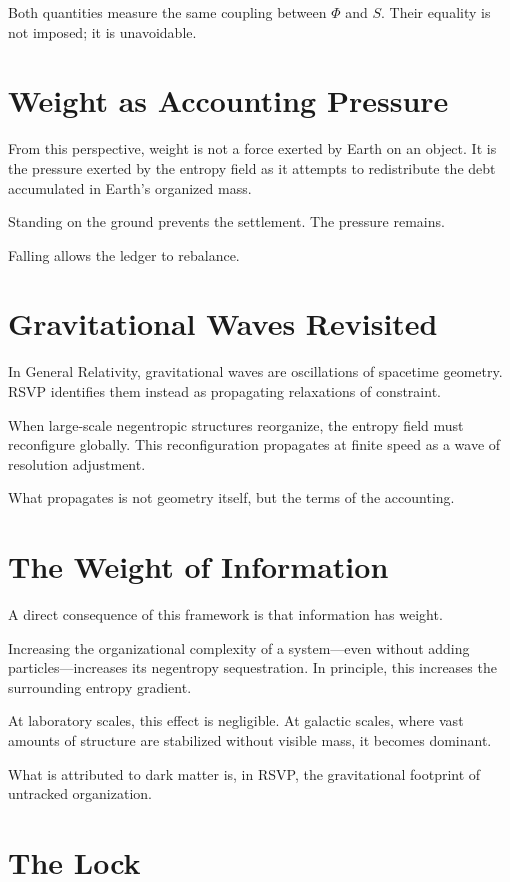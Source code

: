 \documentclass[11pt]{book}
\begin{document}
Both quantities measure the same coupling between \(\Phi\) and \(S\). Their equality is not imposed; it is unavoidable.

\section{Weight as Accounting Pressure}

From this perspective, weight is not a force exerted by Earth on an object. It is the pressure exerted by the entropy field as it attempts to redistribute the debt accumulated in Earth's organized mass.

Standing on the ground prevents the settlement. The pressure remains.

Falling allows the ledger to rebalance.

\section{Gravitational Waves Revisited}

In General Relativity, gravitational waves are oscillations of spacetime geometry. RSVP identifies them instead as propagating relaxations of constraint.

When large-scale negentropic structures reorganize, the entropy field must reconfigure globally. This reconfiguration propagates at finite speed as a wave of resolution adjustment.

What propagates is not geometry itself, but the terms of the accounting.

\section{The Weight of Information}

A direct consequence of this framework is that information has weight.

Increasing the organizational complexity of a system---even without adding particles---increases its negentropy sequestration. In principle, this increases the surrounding entropy gradient.

At laboratory scales, this effect is negligible. At galactic scales, where vast amounts of structure are stabilized without visible mass, it becomes dominant.

What is attributed to dark matter is, in RSVP, the gravitational footprint of untracked organization.

\section{The Lock}
\end{document}
